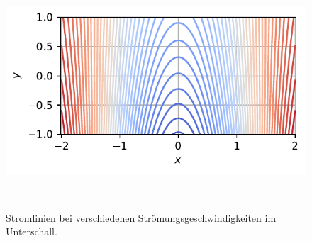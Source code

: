 \begin{figure}
\begin{minipage}[b]{0.32\textwidth}
        \caption*{$\beta = 0.81$ ; $U = 200\,\frac{\mathrm{m}}{\mathrm{s}}$}
    \end{minipage}
    \hfill
    \begin{minipage}[b]{0.32\textwidth}
        \centering
        \includegraphics[width=\linewidth]{papers/ueberschall/figures/abklingen_340.pdf}
        \caption*{$\beta = 0$ ; $U = a$}
    \end{minipage}
    \caption{Stromlinien bei verschiedenen Strömungsgeschwindigkeiten im Unterschall.}
~\label{fig:abklingen_stromlinie}
\end{figure}

